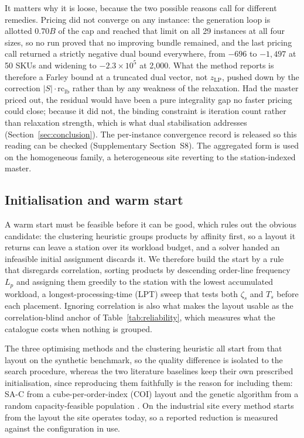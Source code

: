 \documentclass[]{interact}
\begin{document}
It matters why it is loose, because the two possible reasons call for different remedies. Pricing did not converge on any instance: the generation loop is allotted $0.70B$ of the cap and reached that limit on all 29 instances at all four sizes, so no run proved that no improving bundle remained, and the last pricing call returned a strictly negative dual bound everywhere, from $-696$ to $-1{,}497$ at 50 SKUs and widening to $-2.3\times10^{5}$ at 2,000. What the method reports is therefore a Farley bound at a truncated dual vector, not $z_{\mathrm{LP}}$, pushed down by the correction $|S|\cdot\mathrm{rc}_{\mathrm{lb}}$ rather than by any weakness of the relaxation. Had the master priced out, the residual would have been a pure integrality gap no faster pricing could close; because it did not, the binding constraint is iteration count rather than relaxation strength, which is what dual stabilisation addresses (Section~\ref{sec:conclusion}). The per-instance convergence record is released so this reading can be checked (Supplementary Section~S8). The aggregated form is used on the homogeneous family, a heterogeneous site reverting to the station-indexed master.

\subsection{Initialisation and warm start}\label{sec:init}
A warm start must be feasible before it can be good, which rules out the obvious candidate: the clustering heuristic groups products by affinity first, so a layout it returns can leave a station over its workload budget, and a solver handed an infeasible initial assignment discards it. We therefore build the start by a rule that disregards correlation, sorting products by descending order-line frequency $L_p$ and assigning them greedily to the station with the lowest accumulated workload, a longest-processing-time (LPT) sweep that tests both $\zeta_s$ and $T_s$ before each placement. Ignoring correlation is also what makes the layout usable as the correlation-blind anchor of Table~\ref{tab:reliability}, which measures what the catalogue costs when nothing is grouped.

The three optimising methods and the clustering heuristic all start from that layout on the synthetic benchmark, so the quality difference is isolated to the search procedure, whereas the two literature baselines keep their own prescribed initialisation, since reproducing them faithfully is the reason for including them: SA-C from a cube-per-order-index (COI) layout \citep{kim2012} and the genetic algorithm from a random capacity-feasible population \citep{pan2015}. On the industrial site every method starts from the layout the site operates today, so a reported reduction is measured against the configuration in use.
\end{document}
